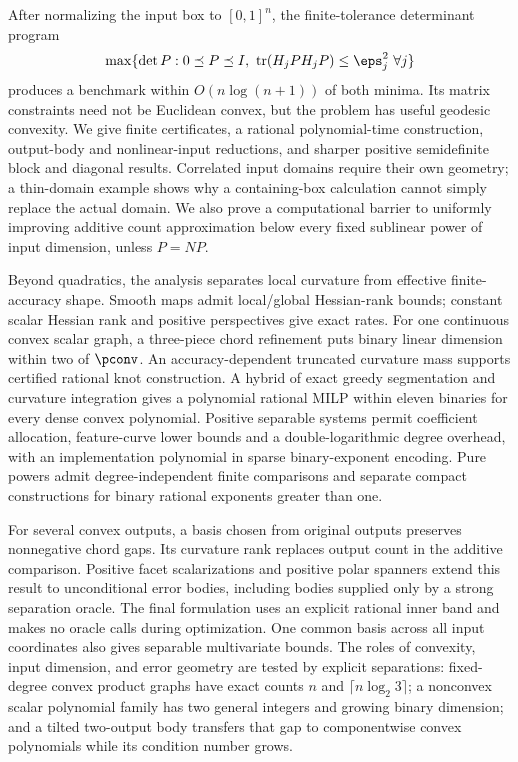 After normalizing the input box to $[0,1]^n$, the finite-tolerance
determinant program
\[
 \max\{\det P:0\preceq P\preceq I,
       \ \operatorname{tr}(H_jPH_jP)\le\eps_j^2\ \forall j\}
\]
produces a benchmark within $O(n\log(n+1))$ of both minima.
Its matrix constraints need not be Euclidean convex, but the problem has
useful geodesic convexity. We give finite certificates, a rational
polynomial-time construction, output-body and nonlinear-input reductions,
and sharper positive semidefinite block and diagonal results. Correlated
input domains require their own geometry; a thin-domain example shows
why a containing-box calculation cannot simply replace the actual domain.
We also prove a computational barrier to uniformly improving additive
count approximation below every fixed sublinear power of input dimension,
unless $P=NP$.

Beyond quadratics, the analysis separates local curvature from effective
finite-accuracy shape. Smooth maps admit local/global Hessian-rank bounds;
constant scalar Hessian rank and positive perspectives give exact rates.
For one continuous convex scalar graph, a three-piece chord refinement
puts binary linear dimension within two of $\pconv$. An accuracy-dependent
truncated curvature mass supports certified rational knot construction.
A hybrid of exact greedy segmentation and curvature integration gives a
polynomial rational MILP within eleven binaries for every dense convex
polynomial. Positive separable systems permit coefficient allocation,
feature-curve lower bounds and a double-logarithmic degree overhead, with
an implementation polynomial in sparse binary-exponent encoding. Pure
powers admit degree-independent finite comparisons and separate compact
constructions for binary rational exponents greater than one.

For several convex outputs, a basis chosen from original outputs preserves
nonnegative chord gaps. Its curvature rank replaces output count in the
additive comparison. Positive facet scalarizations and positive polar
spanners extend this result to unconditional error bodies, including
bodies supplied only by a strong separation oracle. The final formulation
uses an explicit rational inner band and makes no oracle calls during
optimization. One common basis across all input coordinates also gives
separable multivariate bounds. The roles of convexity, input dimension,
and error geometry are tested by explicit separations: fixed-degree convex
product graphs have exact counts $n$ and $\lceil n\log_2 3\rceil$;
a nonconvex scalar polynomial family has two general integers and growing
binary dimension; and a tilted two-output body transfers that gap to
componentwise convex polynomials while its condition number grows.

